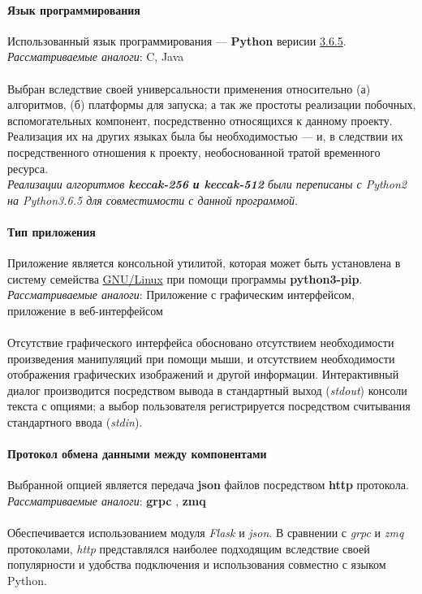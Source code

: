 \paragraph{Язык программирования}
Использованный язык программирования --- \textbf{Python} верисии
\underline{3.6.5}.\\
\emph{Рассматриваемые аналоги}: C, Java\\\\
Выбран вследствие своей универсальности применения
относительно (а) алгоритмов, (б) платформы для запуска; а так же простоты
реализации побочных, вспомогательных компонент, посредственно относящихся к
данному проекту. Реализация их на других языках была бы необходимостью --- и, в
следствии их посредственного отношения к проекту, необоснованной тратой
временного ресурса.\\
\emph{Реализации алгоритмов \textbf{keccak-256 \emph{ и } keccak-512} были
переписаны с Python2 на Python3.6.5 для совместимости с данной программой}.

\paragraph{Тип приложения}
Приложение является консольной утилитой, которая может быть установлена в
систему семейства \underline{GNU/Linux} при помощи программы
\textbf{python3-pip}.\\
\emph{Рассматриваемые аналоги}: Приложение с графическим интерфейсом,
приложение в веб-интерфейсом\\\\
Отсутствие графического интерфейса обосновано отсутствием
необходимости произведения манипуляций при помощи мыши, и отсутствием
необходимости отображения графических изображений и другой информации.
Интерактивный диалог производится посредством вывода в стандартный выход
(\emph{stdout}) консоли текста с опциями; а выбор пользователя регистрируется
посредством считывания стандартного ввода (\emph{stdin}).

\paragraph{Протокол обмена данными между компонентами}
Выбранной опцией является передача \textbf{json} файлов посредством \textbf{http} протокола.\\
\emph{Рассматриваемые аналоги}: \textbf{grpc} \cite{grpc}, \textbf{zmq} \cite{zmq}\\\\
Обеспечивается использованием модуля \emph{Flask} \cite{flask} и \emph{json}. В сравнении
с \emph{grpc} и \textit{zmq} протоколами, \emph{http}
представлялся наиболее подходящим вследствие своей популярности и удобства
подключения и использования совместно с языком Python.

